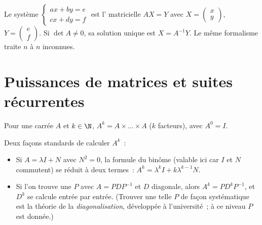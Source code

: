 \begin{method}\label{met:g12:matrix:systems}
Le système
$\begin{cases} ax + by = e\\ cx + dy = f \end{cases}$
est l' matricielle $AX = Y$ avec
$X = \begin{pmatrix} x \\ y\end{pmatrix}$,
$Y = \begin{pmatrix} e \\ f\end{pmatrix}$. Si $\det A \neq 0$, sa solution
unique est $X = A^{-1}Y$. Le même formalisme traite $n$  à $n$
inconnues.
\end{method}

\section{Puissances de matrices et suites récurrentes}

\begin{definition}\label{def:g12:matrix:power}
Pour une  carrée $A$ et $k \in \N$, $A^k = A \times \dots \times A$
($k$ facteurs), avec $A^0 = I$.
\end{definition}

\begin{method}\label{met:g12:matrix:powers}
Deux façons standards de calculer $A^k$~:
\begin{itemize}
  \item Si $A = \lambda I + N$ avec $N^2 = 0$, la formule du binôme
        (valable ici car $I$ et $N$ commutent) se réduit à deux termes~:
        $A^k = \lambda^k I + k \lambda^{k-1} N$.
  \item Si l'on trouve une $P$  avec $A = PDP^{-1}$ et $D$
        diagonale, alors $A^k = P D^k P^{-1}$, et $D^k$ se calcule entrée
        par entrée. (Trouver une telle $P$ de façon systématique est la
        théorie de la \emph{diagonalisation}, développée à l'université~; à
        ce niveau $P$ est donnée.)
\end{itemize}
\end{method}

